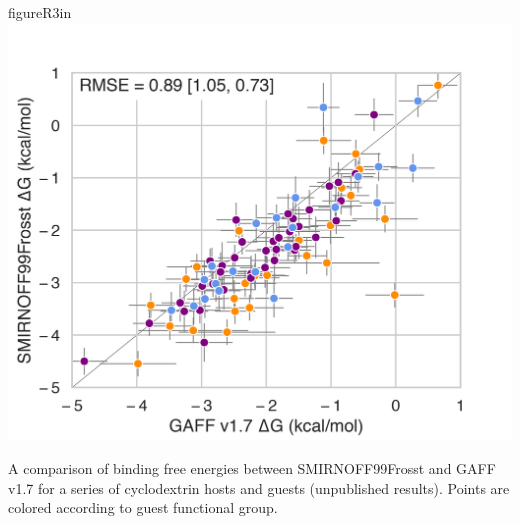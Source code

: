 \documentclass[11pt,notitlepage]{article}
\begin{document}
\begin{wrapfloat}{figure}{R}{3in}
\centering
\includegraphics{content/images/SMIRNOFF-vs-GAFF-deltaG.png}
\caption{A comparison of binding free energies between SMIRNOFF99Frosst
and GAFF v1.7 for a series of cyclodextrin hosts and guests (unpublished
results). Points are colored according to guest functional group.}
\label{fig:smirnoff}
\end{wrapfloat}
\end{document}
